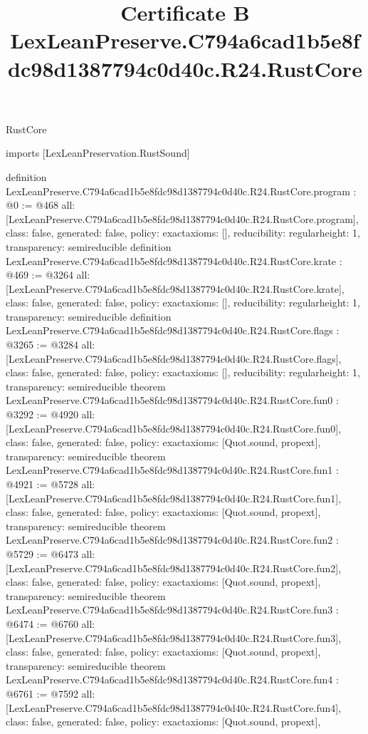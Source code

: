 \begin{lexlean}{RustCore}
\title{Certificate B LexLeanPreserve.C794a6cad1b5e8fdc98d1387794c0d40c.R24.RustCore}
\begin{coremodule}
imports [LexLeanPreservation.RustSound]

definition LexLeanPreserve.C794a6cad1b5e8fdc98d1387794c0d40c.R24.RustCore.program : @0 := @468 {
  all: [LexLeanPreserve.C794a6cad1b5e8fdc98d1387794c0d40c.R24.RustCore.program],
  class: false,
  generated: false,
  policy: exact{axioms: []},
  reducibility: regular{height: 1},
  transparency: semireducible
}
definition LexLeanPreserve.C794a6cad1b5e8fdc98d1387794c0d40c.R24.RustCore.krate : @469 := @3264 {
  all: [LexLeanPreserve.C794a6cad1b5e8fdc98d1387794c0d40c.R24.RustCore.krate],
  class: false,
  generated: false,
  policy: exact{axioms: []},
  reducibility: regular{height: 1},
  transparency: semireducible
}
definition LexLeanPreserve.C794a6cad1b5e8fdc98d1387794c0d40c.R24.RustCore.flags : @3265 := @3284 {
  all: [LexLeanPreserve.C794a6cad1b5e8fdc98d1387794c0d40c.R24.RustCore.flags],
  class: false,
  generated: false,
  policy: exact{axioms: []},
  reducibility: regular{height: 1},
  transparency: semireducible
}
theorem LexLeanPreserve.C794a6cad1b5e8fdc98d1387794c0d40c.R24.RustCore.fun0 : @3292 := @4920 {
  all: [LexLeanPreserve.C794a6cad1b5e8fdc98d1387794c0d40c.R24.RustCore.fun0],
  class: false,
  generated: false,
  policy: exact{axioms: [Quot.sound, propext]},
  transparency: semireducible
}
theorem LexLeanPreserve.C794a6cad1b5e8fdc98d1387794c0d40c.R24.RustCore.fun1 : @4921 := @5728 {
  all: [LexLeanPreserve.C794a6cad1b5e8fdc98d1387794c0d40c.R24.RustCore.fun1],
  class: false,
  generated: false,
  policy: exact{axioms: [Quot.sound, propext]},
  transparency: semireducible
}
theorem LexLeanPreserve.C794a6cad1b5e8fdc98d1387794c0d40c.R24.RustCore.fun2 : @5729 := @6473 {
  all: [LexLeanPreserve.C794a6cad1b5e8fdc98d1387794c0d40c.R24.RustCore.fun2],
  class: false,
  generated: false,
  policy: exact{axioms: [Quot.sound, propext]},
  transparency: semireducible
}
theorem LexLeanPreserve.C794a6cad1b5e8fdc98d1387794c0d40c.R24.RustCore.fun3 : @6474 := @6760 {
  all: [LexLeanPreserve.C794a6cad1b5e8fdc98d1387794c0d40c.R24.RustCore.fun3],
  class: false,
  generated: false,
  policy: exact{axioms: [Quot.sound, propext]},
  transparency: semireducible
}
theorem LexLeanPreserve.C794a6cad1b5e8fdc98d1387794c0d40c.R24.RustCore.fun4 : @6761 := @7592 {
  all: [LexLeanPreserve.C794a6cad1b5e8fdc98d1387794c0d40c.R24.RustCore.fun4],
  class: false,
  generated: false,
  policy: exact{axioms: [Quot.sound, propext]},
}
\end{coremodule}
\end{lexlean}
